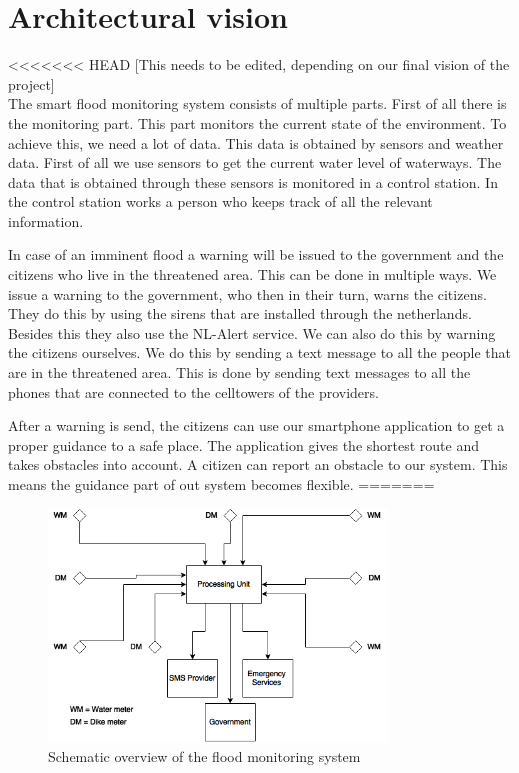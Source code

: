 \section{Architectural vision}
<<<<<<< HEAD
[This needs to be edited, depending on our final vision of the project]\\
The smart flood monitoring system consists of multiple parts. First of all there is the monitoring part. This part monitors the current state of the environment. To achieve this, we need a lot of data. This data is obtained by sensors and weather data. First of all we use sensors to get the current water level of waterways. The data that is obtained through these sensors is monitored in a control station. In the control station works a person who keeps track of all the relevant information. 

In case of an imminent flood a warning will be issued to the government and the citizens who live in the threatened area. This can be done in multiple ways. We issue a warning to the government, who then in their turn, warns the citizens. They do this by using the sirens that are installed through the netherlands. Besides this they also use the NL-Alert service. We can also do this by warning the citizens ourselves. We do this by sending a text message to all the people that are in the threatened area. This is done by sending text messages to all the phones that are connected to the celltowers of the providers. 

After a warning is send, the citizens can use our smartphone application to get a proper guidance to a safe place. The application gives the shortest route and takes obstacles into account. A citizen can report an obstacle to our system. This means the guidance part of out system becomes flexible. 
=======

\begin{figure}[h]
\centering
\includegraphics[width=90mm]{images/architecturalVision.png}
\caption{Schematic overview of the flood monitoring system}
\label{fig:architectural-vision}
\end{figure}

